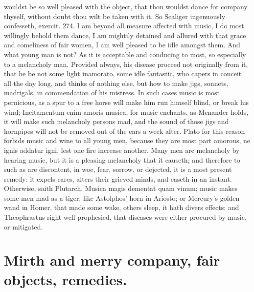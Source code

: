 {wouldst be so well pleased with the object, that thou wouldst dance for
company thyself, without doubt thou wilt be taken with it. So Scaliger
ingenuously confesseth, exercit. 274. I am beyond all measure
affected with music, I do most willingly behold them dance, I am
mightily detained and allured with that grace and comeliness of fair
women, I am well pleased to be idle amongst them. And what young man is
not? As it is acceptable and conducing to most, so especially to a
melancholy man. Provided always, his disease proceed not originally
from it, that he be not some light inamorato, some idle fantastic, who
capers in conceit all the day long, and thinks of nothing else, but how
to make jigs, sonnets, madrigals, in commendation of his mistress. In
such cases music is most pernicious, as a spur to a free horse will
make him run himself blind, or break his wind; Incitamentum enim amoris
musica, for music enchants, as Menander holds, it will make such
melancholy persons mad, and the sound of those jigs and hornpipes will
not be removed out of the ears a week after. Plato for this
reason forbids music and wine to all young men, because they are most
part amorous, ne ignis addatur igni, lest one fire increase another.
Many men are melancholy by hearing music, but it is a pleasing
melancholy that it causeth; and therefore to such as are discontent, in
woe, fear, sorrow, or dejected, it is a most present remedy: it expels
cares, alters their grieved minds, and easeth in an instant. Otherwise,
saith Plutarch, Musica magis dementat quam vinum; music makes
some men mad as a tiger; like Astolphos' horn in Ariosto; or Mercury's
golden wand in Homer, that made some wake, others sleep, it hath divers
effects: and Theophrastus right well prophesied, that diseases
were either procured by music, or mitigated.

\section[Mirth and merry company]{Mirth and merry company, fair objects, remedies.}

}
